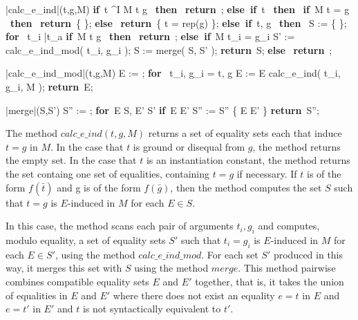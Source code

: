 \documentclass{llncs}
\def\IF{\qtab\keyword{if}\ }
\def\THEN{\ \keyword{then}\ }
\def\ELSE{\untab\qtab\keyword{else}\ }
\def\ELSEIF{\untab\qtab\keyword{else if}\ }
\def\FI{\untab}
\def\RETURN{\keyword{return}\ }
\def\ENDPROC{\untab}
\def\DOFOR{\qtab\keyword{for}\ }
\def\ENDFOR{\untab}
\def\keyword#1{\mbox{\normalshape\bf #1}}
\begin{document}
\begin{minipage}[t]{.4\linewidth}
\begin{program}
\PROC |calc\_e\_ind|(t,g,M) \BODY
  \IF t \not\mapsto^I \psi {} M \models t \neq g \THEN
    \RETURN \emptyset;
  \ELSEIF t  \THEN
    \IF M \models t = g \THEN
      \RETURN \{ \emptyset \};
    \ELSE
      \RETURN \{ t = rep(g) \};
    \FI
  \ELSEIF t, g  \THEN
    S := \{ \emptyset \};
    \DOFOR {} t_i  \bar{t_a} 
      \IF M \models t \neq g \THEN
        \RETURN \emptyset;
      \ELSEIF M \not\models t_i = g_i
        S' := calc\_e\_ind\_mod( t_i, g_i );
        S := merge( S, S' );
      \FI
    \ENDFOR
    \RETURN S;
  \ELSE
    \RETURN \emptyset;
  \FI
\ENDPROC
\end{program}
\end{minipage}
\begin{minipage}[t]{.4\linewidth}
\begin{program}
\PROC |calc\_e\_ind\_mod|(t,g,M) \BODY
  E := \emptyset;
  \DOFOR {} t_i, g_i = t, g
    E := E \cup calc\_e\_ind( t_i, g_i, M );
  \ENDFOR
  \RETURN E;
\ENDPROC
\end{program}
\begin{program}
\PROC |merge|(S,S') \BODY
  S'' := \emptyset;
  \DOFOR E \in S, E' \in S'
    \IF E  E' 
      S'' := S'' \cup \{ E \cup E' \}
    \FI
  \ENDFOR
  \RETURN S'';
\ENDPROC
\end{program}
\end{minipage}

The method $calc\_e\_ind(t,g,M)$ returns a set of equality sets each that induce $t = g$ in $M$.
In the case that $t$ is ground or disequal from $g$, the method returns the empty set.
In the case that $t$ is an instantiation constant, the method returns the set containg one set of equalities, containing $t = g$ if necessary.
If $t$ is of the form $f(\bar{t})$ and g is of the form $f(\bar{g})$, then the method computes the set $S$ such that $t = g$ is $E$-induced in $M$ for each $E \in S$.

In this case, the method scans each pair of arguments $t_i, g_i$ and computes, modulo equality, a set of equality sets $S'$ such that $t_i = g_i$ is $E$-induced in $M$ for each $E \in S'$, using the method $calc\_e\_ind\_mod$.
For each set $S'$ produced in this way, it merges this set with $S$ using the method $merge$.
This method pairwise combines compatible equality sets $E$ and $E'$ together, that is, it takes the union of equalities in $E$ and $E'$ where there does not exist an equality $e = t$ in $E$ and $e = t'$ in $E'$ and $t$ is not syntactically equivalent to $t'$.
\end{document}
